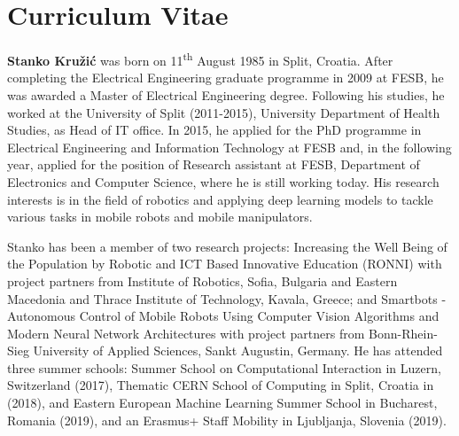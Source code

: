 

\newpage \mbox{} \newpage \pagestyle{empty}

\section*{Curriculum Vitae}

\vspace{15mm}

{\noindent\bf{Stanko Kružić}} was born on 11\textsuperscript{th} August 1985 in Split, Croatia. After completing the Electrical Engineering graduate programme in 2009 at FESB, he was awarded a Master of Electrical Engineering degree. Following his studies, he worked at the University of Split (2011-2015), University Department of Health Studies, as Head of IT office. In 2015, he applied for the PhD programme in Electrical Engineering and Information Technology at FESB and, in the following year, applied for the position of Research assistant at FESB, Department of Electronics and Computer Science, where he is still working today. His research interests is in the field of robotics and applying deep learning models to tackle various tasks in mobile robots and mobile manipulators. 

\noindent Stanko has been a member of two research projects: Increasing the Well Being of the Population by Robotic and ICT Based Innovative Education (RONNI) with project partners from Institute of Robotics, Sofia, Bulgaria and Eastern Macedonia and Thrace Institute of Technology, Kavala, Greece; and Smartbots - Autonomous Control of Mobile Robots Using Computer Vision Algorithms and Modern Neural Network Architectures with project partners from Bonn-Rhein-Sieg University of Applied Sciences, Sankt Augustin, Germany. He has attended three summer schools: Summer School on Computational Interaction in Luzern, Switzerland (2017), Thematic CERN School of Computing in Split, Croatia in (2018), and Eastern European Machine Learning Summer School in Bucharest, Romania (2019), and an Erasmus+ Staff Mobility in Ljubljanja, Slovenia (2019).

